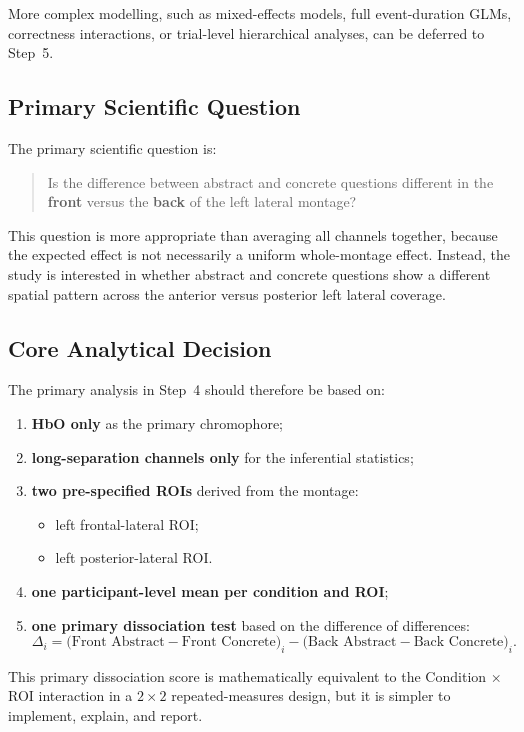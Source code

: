 More complex modelling, such as mixed-effects models, full event-duration GLMs, correctness interactions,
or trial-level hierarchical analyses, can be deferred to Step~5.

\subsection{Primary Scientific Question}
The primary scientific question is:
\begin{quote}
Is the difference between abstract and concrete questions different in the \textbf{front} versus the
\textbf{back} of the left lateral montage?
\end{quote}

This question is more appropriate than averaging all channels together, because the expected effect is
not necessarily a uniform whole-montage effect.
Instead, the study is interested in whether abstract and concrete questions show a different spatial
pattern across the anterior versus posterior left lateral coverage.

\subsection{Core Analytical Decision}
The primary analysis in Step~4 should therefore be based on:
\begin{enumerate}
    \item \textbf{HbO only} as the primary chromophore;
    \item \textbf{long-separation channels only} for the inferential statistics;
    \item \textbf{two pre-specified ROIs} derived from the montage:
    \begin{itemize}
        \item left frontal-lateral ROI;
        \item left posterior-lateral ROI.
    \end{itemize}
    \item \textbf{one participant-level mean per condition and ROI};
    \item \textbf{one primary dissociation test} based on the difference of differences:
    \[
    \Delta_i =
    \bigl(\text{Front Abstract} - \text{Front Concrete}\bigr)_i
    -
    \bigl(\text{Back Abstract} - \text{Back Concrete}\bigr)_i.
    \]
\end{enumerate}

This primary dissociation score is mathematically equivalent to the
Condition $\times$ ROI interaction in a \(2 \times 2\) repeated-measures design,
but it is simpler to implement, explain, and report.


